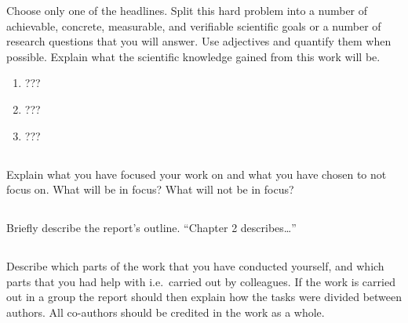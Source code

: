Choose only one of the headlines. Split this hard problem into a number of achievable, concrete,
measurable, and verifiable scientific goals or a number of research questions that you will answer.
Use adjectives and quantify them when possible. Explain what the scientific knowledge gained from
this work will be.

\begin{enumerate}
  \item ???
  \item ???
  \item ???
\end{enumerate}

\subsection{}\label{subsec:scope}
\noindent
Explain what you have focused your work on and what you have chosen to not focus
on. What will be in focus? What will not be in focus?

\subsection{}\label{subsec:outline}
\noindent
Briefly describe the report's outline. ``Chapter 2 describes\dots''

\subsection{}\label{subsec:contributions}
\noindent 
Describe which parts of the work that you have conducted yourself, and which
parts that you had help with i.e.\ carried out by colleagues. If the work is
carried out in a group the report should then explain how the tasks were divided
between authors. All co-authors should be credited in the work as a whole.
